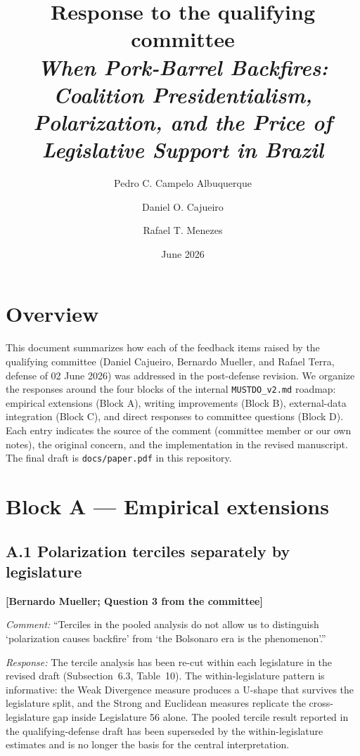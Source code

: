 \documentclass[11pt]{article}
\title{Response to the qualifying committee \\
\large \emph{When Pork-Barrel Backfires: Coalition Presidentialism, Polarization,
and the Price of Legislative Support in Brazil}}
\author{Pedro C. Campelo Albuquerque \and Daniel O. Cajueiro \and Rafael T. Menezes}
\date{June 2026}
\newcommand{\committee}[1]{\textbf{[#1]}}
\begin{document}
\maketitle

\section*{Overview}

This document summarizes how each of the feedback items raised by the qualifying
committee (Daniel Cajueiro, Bernardo Mueller, and Rafael Terra, defense of
02 June 2026) was addressed in the post-defense revision. We organize the
responses around the four blocks of the internal \texttt{MUSTDO\_v2.md}
roadmap: empirical extensions (Block A), writing improvements (Block B),
external-data integration (Block C), and direct responses to committee
questions (Block D). Each entry indicates the source of the comment
(committee member or our own notes), the original concern, and the
implementation in the revised manuscript. The final draft is
\texttt{docs/paper.pdf} in this repository.

\section{Block A — Empirical extensions}

\subsection*{A.1 \quad Polarization terciles separately by legislature}
\committee{Bernardo Mueller; Question 3 from the committee}

\noindent\emph{Comment:} ``Terciles in the pooled analysis do not allow us to
distinguish `polarization causes backfire' from `the Bolsonaro era is the phenomenon'.''

\noindent\emph{Response:} The tercile analysis has been re-cut within each
legislature in the revised draft (Subsection~6.3, Table~10). The
within-legislature pattern is informative: the Weak Divergence measure
produces a U-shape that survives the legislature split, and the Strong
and Euclidean measures replicate the cross-legislature gap inside
Legislature 56 alone. The pooled tercile result reported in the
qualifying-defense draft has been superseded by the within-legislature
estimates and is no longer the basis for the central interpretation.
\end{document}
